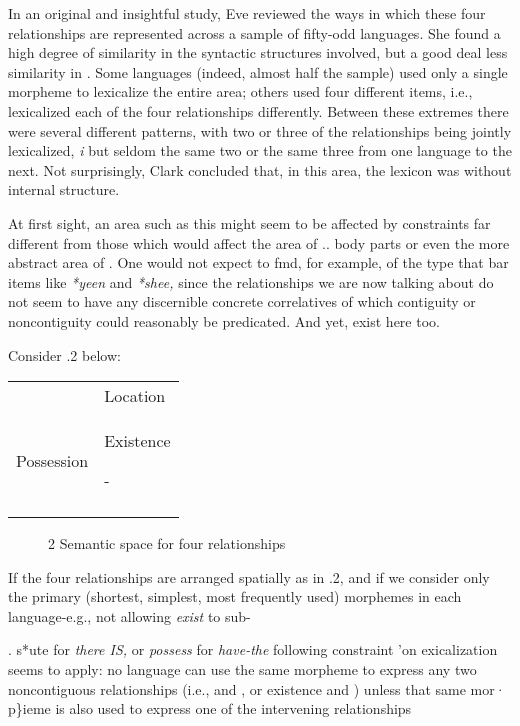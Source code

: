 In an original and insightful study, Eve \citet{Clark1970} reviewed the ways in which these four relationships are represented across a sample of fifty-odd languages. She found a high degree of similarity in the syntactic structures involved, but a good deal less similarity in . Some languages (indeed, almost half the sample) used only a single morpheme to lexicalize the entire area; others used four different items, i.e., lexicalized each of the four relationships differently. Between these extremes there were several different patterns, with two or three of the relationships being jointly lexicalized, \textit{i} but seldom the same two or the same three from one language to the next. Not surprisingly, Clark concluded that, in this area, the lexicon was without internal structure.

At first sight, an area such as this might seem to be affected by
constraints far different from those which would affect the area of ..
body parts or even the more abstract area of . One would not expect to fmd, for example,  of the type that bar items like \textit{*yeen} and \textit{*shee,} since the relationships we are now talking about do not seem to have any discernible concrete correlatives of which contiguity or noncontiguity could reasonably be predicated. And yet,  exist here too.

Consider .2 below:

\begin{tabular}{ll}
\lsptoprule

\multicolumn{1}{l}{Ownership} & Location\\
Possession & Existence

 {}-\\
\lspbottomrule
\end{tabular}
\begin{figure}
\caption{2 Semantic space for four relationships}
\label{fig:4}
\end{figure}



If the four relationships are arranged spatially as in .2, and if we consider only the primary (shortest, simplest, most frequently used) morphemes in each language-e.g., not allowing \textit{exist }to sub-

. s*ute for \textit{there IS, }or \textit{possess }for \textit{have-the }following constraint 'on exicalization seems to apply: no language can use the same mor\-pheme to express any two noncontiguous relationships (i.e.,  and , or existence and ) unless that same mor· p\}ieme is also used to express one of the intervening relationships


